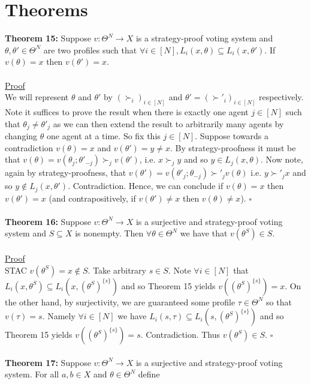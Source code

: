 \documentclass[11pt]{article}
\theoremstyle{definition}
\theoremstyle{plain}
\begin{document}
\section{Theorems}
\textbf{Theorem 15:} Suppose $v: \Theta^N \to X$ is a strategy-proof voting system
and $\theta, \theta' \in \Theta^N$ are two profiles such that $\forall i \in [N],
L_i(x,\theta) \subseteq L_i(x,\theta')$. If $v(\theta)=x$ then $v(\theta')=x$.
\\
\\
\underline{Proof}
\\
We will represent $\theta$ and $\theta'$ by $(\succ_i)_{i \in [N]}$ and $
\theta'=(\succ'_i)_{i \in [N]}$ respectively. Note it suffices to prove the result
when there is exactly one agent $j\in [N]$ such that $\theta_j \neq \theta'_{j}$ as
we can then extend the result to arbitrarily many agents by changing $\theta$ one
agent at a time. So fix this $j \in [N]$. Suppose towards a contradiction
$v(\theta)=x$ and $v(\theta')=y \neq x$. By strategy-proofness it must be that
$v(\theta)=v(\theta_j; \theta'_{-j}) \succ_j v(\theta')$, i.e. $x \succ_j y$ and so $y \in
L_j(x,\theta)$. Now note, again by strategy-proofness, that $v(\theta') =v(\theta'_j; \theta_{-
j}) \succ'_j v(\theta)$ i.e. $y \succ'_j x$ and so $y \notin L_j(x,
\theta')$. Contradiction. Hence, we can conclude if $v(\theta)=x$ then $v(\theta')=x$ (and contrapositively, if $v(\theta') \neq x$ then $v(\theta) \neq x$). $\square$
\\
\\
\textbf{Theorem 16:} Suppose $v: \Theta^N \to X$ is a surjective and strategy-proof voting system and $S\subseteq X$ is nonempty. Then $\forall \theta \in \Theta^N$  we have that $v(\theta^S) \in S$. 
\\
\\
\underline{Proof}
\\
STAC $v(\theta^S)=x \notin S$. Take arbitrary $s \in S$.  Note $\forall i \in [N]$ that $L_i(x,{\theta^S}) \subseteq L_i(x,({\theta^S})^{\{s\}})$  and so Theorem 15 yields $v((\theta^S)^{\{s\}})=x$. On the other hand, by surjectivity, we are guaranteed some profile $\tau \in \Theta^N$ so that $v(\tau)=s$. Namely $\forall i \in [N]$ we have $L_i(s,\tau) \subseteq L_i(s,({\theta^S})^{\{s\}})$ and so Theorem 15 yields $v((\theta^S)^{\{s\}})=s$. Contradiction. Thus $v(\theta^S) \in S$. $\square$
\\
\\
\textbf{Theorem 17:} Suppose $v: \Theta^N \to X$ is a surjective and strategy-proof
voting system. For all $a,b \in X$ and $\theta \in \Theta^N$ define
\end{document}

